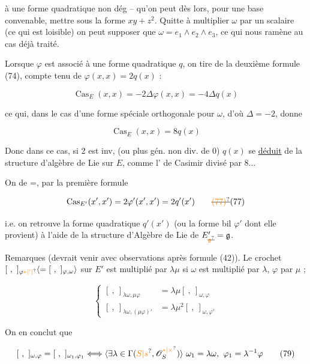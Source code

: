 à une forme quadratique non dég -- qu'on peut dès lors, pour une base convenable, mettre sous la forme $xy+z^2$. Quitte à multiplier $\omega$ par un scalaire (ce qui est loisible) on peut supposer que $\omega=e_1\wedge e_2\wedge e_3$, ce qui nous ramène au cas déjà traité.

Lorsque $\varphi$ est associé à une forme quadratique $q$, on tire de la deuxième formule (74), compte tenu de $\varphi(x,x)=2q(x)$ :

\[
\operatorname{Cas}_E(x,x)=-2\Delta\varphi(x,x)=-4\Delta q(x) \tag*{(75)}
\]

ce qui, dans le cas d'une forme  spéciale orthogonale pour $\omega$, d'où $\Delta=-2$, donne

\[
\operatorname{Cas}_E(x,x)=8q(x) \tag*{(76)}
\]

Donc dans ce cas,  si 2 est inv, (ou plus gén. non div. de 0) $q(x)$ se \uline{déduit} de la structure d'algèbre de Lie sur $E$, comme l' de Casimir divisé par $8\ldots$

On  de =, par la première formule

\[
\operatorname{Cas}_{E'}(x',x')=2\varphi'(x',x')=2q'(x') \tag*{\deleted{\unsure{(77)}}(77)}
\]

i.e. on retrouve la forme quadratique $q'(x')$ (ou la forme bil $\varphi'$ dont elle provient) à l'aide de la structure d'Algèbre de Lie de $E'_{\deleted{\unsure{\mathfrak g}}}=\mathfrak g$.

Remarques (devrait venir avec observations après formule (42)). Le crochet $[\ ,\ ]_{\varphi\unsure{*|'|{}}}\inserted{=[\ ,\ ]_{\varphi,\omega}}$ sur $E'$ est multiplié par $\lambda\mu$ si $\omega$ est multiplié par $\lambda$, $\varphi$ par $\mu$ ; 

\[
\left\{\begin{aligned}
[\ ,\ ]_{\lambda\omega,\mu\varphi}&=\lambda\mu[\ ,\ ]_{\omega,\varphi}\\
[\ ,\ ]_{\lambda\omega,(\mu\varphi)'}&=\lambda\mu^2[\ ,\ ]_{\omega,\varphi'}
\end{aligned}\right. \tag*{(78)}
\]

On en conclut que

\[
[\ ,\ ]_{\omega,\varphi}=[\ ,\ ]_{\omega_1,\varphi_1}
\Longleftrightarrow\inserted{\exists\lambda\in\Gamma(\unsure{S|s},\mathscr O_S^{\unsure{*|\times}})}
\ \omega_1=\lambda\omega,\ \varphi_1=\lambda^{-1}\varphi \tag*{(79)}
\]

